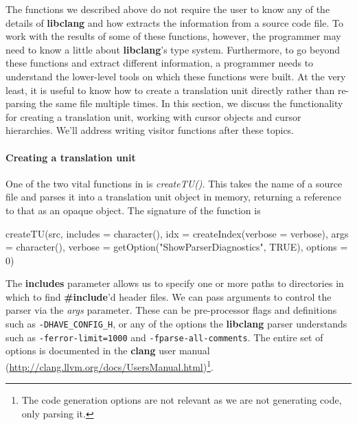 \documentclass[article]{jss}
\def\R{\proglang{R}}
\def\Rpkg#1{\pkg{#1}}
\def\Rfunc#1{\textsl{#1()}}
\def\Rvar#1{\textsl{#1}}
\def\Rarg#1{\textbf{#1}}
\def\Ckeyword#1{\textbf{#1}}
\def\libclang{\textbf{libclang}}
\def\clang{\textbf{clang}}
\def\libclangFlag#1{-\nolinebreak\texttt{#1}}
\begin{document}
The functions we described above do not require the user to know any
of the details of \libclang{} and how \Rpkg{RCIndex} extracts the
information from a source code file.  To work with the results of some
of these functions, however, the \R{} programmer may need to know a
little about \libclang's type system. Furthermore, to go beyond these
functions and extract different information, a programmer needs to
understand the lower-level tools on which these functions were built.
At the very least, it is useful to know how to create a translation
unit directly rather than re-parsing the same file multiple times.  In
this section, we discuss the functionality for creating a translation
unit, working with cursor objects and cursor hierarchies.  We'll
address writing visitor functions after these topics.



\paragraph{Creating a translation unit} 
One of the two vital functions in \Rpkg{RCIndex} is \Rfunc{createTU}.
This takes the name of a source file and parses it into a translation
unit object in memory, returning a reference to that as an opaque \R{}
object.
The signature of the function is 
\begin{RCode}
createTU(src, includes = character(), 
         idx = createIndex(verbose = verbose), 
         args = character(), 
         verbose = getOption("ShowParserDiagnostics", TRUE), options = 0)   
\end{RCode}
The \Rarg{includes} parameter allows us to specify one or more paths
to directories in which to find \Ckeyword{\#include}'d header files. We
can pass arguments to control the parser via the \Rvar{args}
parameter. These can be pre-processor flags and definitions such as
\verb+-DHAVE_CONFIG_H+, or any of the options the \libclang{} parser
understands such as \texttt{-ferror-limit=1000} %
and
\mbox{\texttt{-fparse-all-comments}}. %
The entire set of options is documented in
the \clang{} user manual
(\url{http://clang.llvm.org/docs/UsersManual.html})\footnote{The code
  generation options are not relevant as we are not generating code,
  only parsing it.}.
\end{document}
